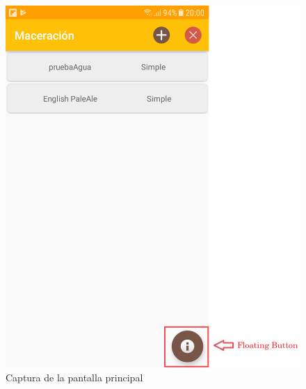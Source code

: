                 \begin{figure}[h]
                    \centering
                    \includegraphics[scale=0.2]{software/ScreenCapture/MainActivity.jpg}
                    \caption{Captura de la pantalla principal}
                    \label{fig:CapturaMainAct}
                \end{figure}
                               
